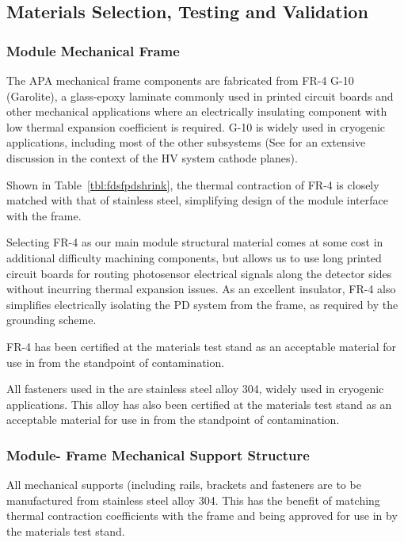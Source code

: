 \subsection{Materials Selection, Testing and Validation}

\subsubsection{ Module Mechanical Frame}

The APA mechanical frame components are fabricated from FR-4 G-10 (Garolite\textregistered), a glass-epoxy laminate commonly used in printed circuit boards and other mechanical applications where an electrically insulating component with low thermal expansion coefficient is required.  G-10 is widely used in cryogenic applications, including most of the other  subsystems (See  for an extensive discussion in the context of the HV system cathode planes). 

Shown in Table~\ref{tbl:fdsfpdshrink}, the thermal contraction of FR-4 is closely matched with that of stainless steel, simplifying design of the module interface with the  frame.

Selecting FR-4 as our main module structural material comes at some cost in additional difficulty machining components, but allows us to use long printed circuit boards for routing photosensor electrical signals along the detector sides without incurring thermal expansion issues.  As an excellent insulator, FR-4 also simplifies electrically isolating the PD system from the  frame, as required by the  grounding scheme.

FR-4 has been certified at the  materials test stand as an acceptable material for use in  from the standpoint of  contamination.

All fasteners used in the  are stainless steel alloy 304, widely used in cryogenic applications.  This alloy has also been certified at the  materials test stand as an acceptable material for use in  from the standpoint of  contamination.

\subsubsection{ Module- Frame Mechanical Support Structure}

All  mechanical supports (including rails, brackets and fasteners are to be manufactured from stainless steel alloy 304.  This has the benefit of matching thermal contraction coefficients with the  frame and being approved for use in  by the materials test stand.

